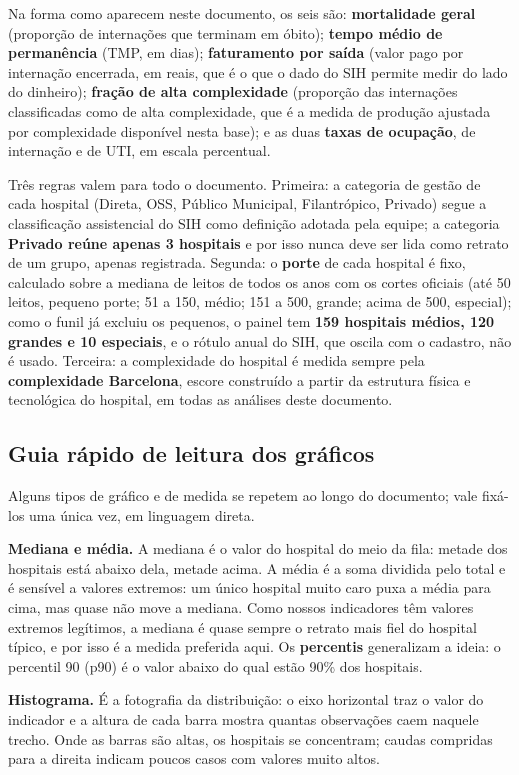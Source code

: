 Na forma como aparecem neste documento, os seis são: \textbf{mortalidade
geral} (proporção de internações que terminam em óbito); \textbf{tempo
médio de permanência} (TMP, em dias); \textbf{faturamento por saída}
(valor pago por internação encerrada, em reais, que é o que o dado do SIH
permite medir do lado do dinheiro); \textbf{fração de alta complexidade}
(proporção das internações classificadas como de alta complexidade, que é
a medida de produção ajustada por complexidade disponível nesta base); e
as duas \textbf{taxas de ocupação}, de internação e de UTI, em escala
percentual.

Três regras valem para todo o documento. Primeira: a categoria de
gestão de cada hospital (Direta, OSS, Público Municipal, Filantrópico,
Privado) segue a classificação assistencial do SIH como definição
adotada pela equipe; a categoria \textbf{Privado reúne apenas 3
hospitais} e por isso nunca deve ser lida como retrato de um grupo,
apenas registrada. Segunda: o \textbf{porte} de cada hospital é fixo,
calculado sobre a mediana de leitos de todos os anos com os cortes
oficiais (até 50 leitos, pequeno porte; 51 a 150, médio; 151 a 500,
grande; acima de 500, especial); como o funil já excluiu os pequenos, o
painel tem \textbf{159 hospitais médios, 120 grandes e 10 especiais}, e
o rótulo anual do SIH, que oscila com o cadastro, não é usado.
Terceira: a complexidade do hospital é medida sempre pela
\textbf{complexidade Barcelona}, escore construído a partir da estrutura
física e tecnológica do hospital, em todas as análises deste documento.
\newpage
\subsection{Guia rápido de leitura dos gráficos}

Alguns tipos de gráfico e de medida se repetem ao longo do documento;
vale fixá-los uma única vez, em linguagem direta.


\textbf{Mediana e média.} A mediana é o valor do hospital do meio da
fila: metade dos hospitais está abaixo dela, metade acima. A média é a
soma dividida pelo total e é sensível a valores extremos: um único
hospital muito caro puxa a média para cima, mas quase não move a
mediana. Como nossos indicadores têm valores extremos legítimos, a
mediana é quase sempre o retrato mais fiel do hospital típico, e por
isso é a medida preferida aqui. Os \textbf{percentis} generalizam a
ideia: o percentil 90 (p90) é o valor abaixo do qual estão 90\% dos
hospitais.

\textbf{Histograma.} É a fotografia da distribuição: o eixo horizontal
traz o valor do indicador e a altura de cada barra mostra quantas
observações caem naquele trecho. Onde as barras são altas, os hospitais
se concentram; caudas compridas para a direita indicam poucos casos com
valores muito altos.

